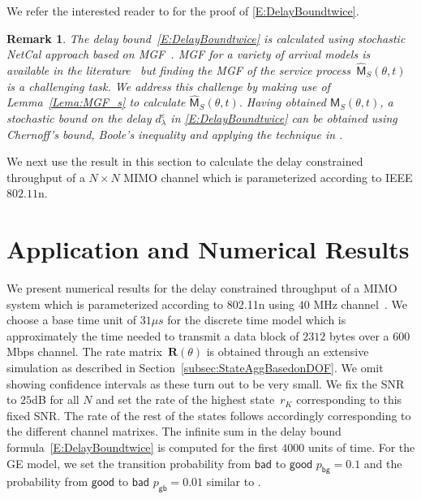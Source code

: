 \documentclass[10pt,conference]{IEEEtran}
\newtheorem{remark}{Remark}
\begin{document}
\begin{IEEEproof}
We refer the interested reader to \cite{NetCal:Chang00:PerGuaran:Bk} for the proof of \eqref{E:DelayBoundtwice}.
\end{IEEEproof}
\begin{remark}
    \label{Rem:Dbound}
The delay bound~\eqref{E:DelayBoundtwice} is calculated using stochastic NetCal approach based on MGF~\cite{NetCal:Fidler2006:EoEProbabNetCalWithMGF}.
MGF for a variety of arrival models is available in the literature~\cite{NetCal:Chang00:PerGuaran:Bk} but finding the MGF of the service process~$\widehat{\mathsf{M}}_S(\theta,t)$ is a challenging task.
We address this challenge by making use of Lemma~\ref{Lema:MGF_s} to calculate $\widehat{\mathsf{M}}_S(\theta,t).$
Having obtained $\widehat{\mathsf{M}}_S(\theta,t)$, a stochastic bound on the delay $d^{\varepsilon}_{\lambda}$ in \eqref{E:DelayBoundtwice} can be obtained using Chernoff's bound, Boole's inequality and applying the technique in \cite{NetCal:Fidler2006:EoEProbabNetCalWithMGF}.

\end{remark}


We next use the result in this section to calculate the delay constrained throughput of a $N \times N$ MIMO channel which is parameterized according to IEEE $802.11$n.
\section{Application and Numerical Results}
\label{Sec:NumericalResults}
We present numerical results for the delay constrained throughput of a MIMO system which is parameterized according to 802.11n using $40$ MHz channel~\cite{MIMO:80211n:standard}.
We choose a base time unit of $31\mu s$ for the discrete time model which is approximately the time needed to transmit a data block of $2312$ bytes over a $600$ Mbps channel.
The rate matrix~$\mathbf{R}(\theta)$ is obtained through an extensive simulation as described in Section~\ref{subsec:StateAggBasedonDOF}.
We omit showing confidence intervals as these turn out to be very small.
We fix the SNR to $25$dB for all $N$ and set the rate of the highest state~$r_K$ corresponding to this fixed SNR.
The rate of the rest of the states follows accordingly corresponding to the different channel matrixes.
The infinite sum in the delay bound formula~\eqref{E:DelayBoundtwice} is computed for the first $4000$ units of time.
For the GE model, we set the transition probability from $\mathsf{bad}$ to $\mathsf{good}$ $p_{\mathsf{bg}} = 0.1$ and the probability from $\mathsf{good}$ to $\mathsf{bad}$ $p_{\mathsf{gb}} = 0.01$ similar to \cite{NetCal:Fidler06:MGFfadingChannel}.
\end{document}

